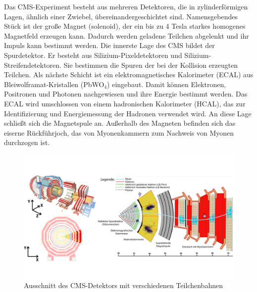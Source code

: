 Das CMS-Experiment besteht aus mehreren Detektoren, die in zylinderf\"ormigen Lagen, \"ahnlich einer Zwiebel, \"ubereinandergeschichtet sind. Namensgebendes St\"uck ist der gro\ss e Magnet (solenoid), der ein bis zu \num{4} Tesla starkes homogenes Magnetfeld erzeugen kann. Dadurch werden geladene Teilchen abgelenkt und ihr Impuls kann bestimmt werden. Die innerste Lage des CMS bildet der Spurdetektor. Er besteht aus Silizium-Pixeldetektoren und Silizium-Streifendetektoren. Sie bestimmen die Spuren der bei der Kollision erzeugten Teilchen. Als n\"achste Schicht ist ein elektromagnetisches Kalorimeter (ECAL) aus Bleiwolframat-Kristallen (PbWO$_4$) eingebaut. Damit k\"onnen Elektronen, Positronen und Photonen nachgewiesen und ihre Energie bestimmt werden. Das ECAL wird umschlossen von einem hadronischen Kalorimeter (HCAL), das zur Identifizierung und Energiemessung der Hadronen verwendet wird. An diese Lage schlie\ss t sich die Magnetspule an. Au\ss erhalb des Magneten befinden sich das eiserne R\"uckf\"uhrjoch, das von Myonenkammern zum Nachweis von Myonen durchzogen ist.\\

\begin{figure}[tbp]
 \begin{center}
   \includegraphics[width=\textwidth]{graphics/cms_slice.png}
   \parbox[b]{12cm}{
     \caption[CMS-Detektor]
             {\label{fig:cms_slice}Ausschnitt des CMS-Detektors mit verschiedenen Teilchenbahnen \cite{cms_slice}}
   }
 \end{center}
\end{figure}

